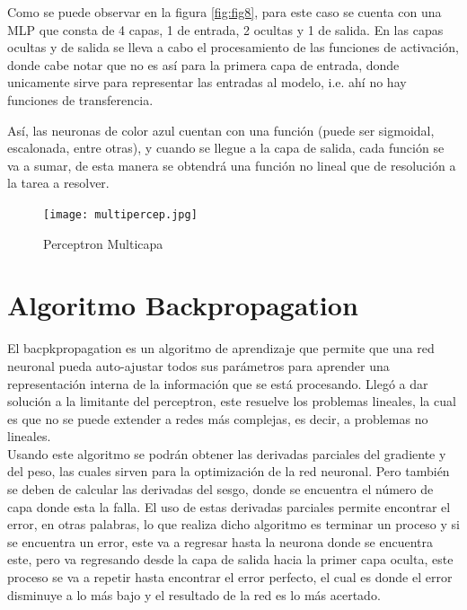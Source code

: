             Como se puede observar en la figura \eqref{fig:fig8}, para este caso se cuenta con una MLP que consta de 4 capas,  1 de entrada, 2 ocultas y 1 de salida. En las capas ocultas y de salida se lleva a cabo el procesamiento de las funciones de activación, donde cabe notar que no es así para la primera capa de entrada, donde unicamente sirve para representar las entradas al modelo, i.e. ahí no hay funciones de transferencia. 
            
Así, las neuronas de color azul cuentan con una funci\'on (puede ser sigmoidal, escalonada, entre otras), 
            y cuando se llegue a la capa de salida, cada funci\'on se va a sumar, de esta manera 
            se obtendrá una funci\'on no lineal que de resoluci\'on a la tarea a resolver.

            \begin{figure}[H]
                \centering
                \texttt{[image: multipercep.jpg]}
                \caption{Perceptron Multicapa}
                \label{fig:fig8}
            \end{figure}

            
        \section{Algoritmo Backpropagation}
        	
        	
        	El bacpkpropagation es un algoritmo de aprendizaje que permite que una red neuronal pueda auto-ajustar todos sus parámetros para aprender una representaci\'on 
            interna de la informaci\'on que se está procesando. Lleg\'o a dar solución a la limitante del perceptron, este 
            resuelve los problemas lineales, la cual es que no se puede extender a redes más complejas, 
            es decir, a problemas no lineales. \\

            Usando este algoritmo se podrán obtener las derivadas parciales del gradiente y del peso, las cuales
            sirven para la optimizaci\'on de la red neuronal.
            Pero también se deben de calcular las derivadas del sesgo, donde se encuentra el n\'umero de capa donde esta la falla.
            El uso de estas derivadas parciales permite encontrar el error, en otras palabras, lo que realiza dicho algoritmo es terminar un proceso y 
            si se encuentra un error, este va a regresar
            hasta la neurona donde se encuentra este, pero va regresando desde la capa de salida hacia la primer capa oculta, este proceso se va a 
            repetir hasta encontrar el error perfecto, el cual es donde el error disminuye a lo m\'as bajo y el resultado
            de la red es lo m\'as acertado.\\

